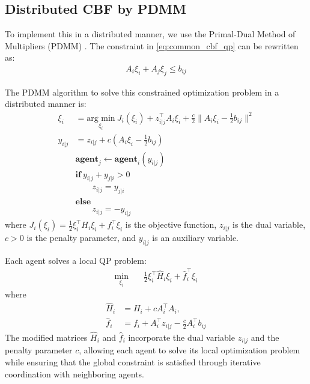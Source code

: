 \documentclass[fleqn,10pt,twocolumn]{SICE_FES25}
\theoremstyle{definition}
\theoremstyle{plain}
\begin{document}
\subsection{Distributed CBF by PDMM}

To implement this in a distributed manner, we use the Primal-Dual Method of Multipliers (PDMM) \cite{ref10}. The constraint in \eqref{eq:common_cbf_qp} can be rewritten as:
\begin{equation}
\begin{aligned}
A_i \xi_i + A_j \xi_j \leq b_{ij}
\label{eq:common_cbf_constraint_rewritten}
\end{aligned}
\end{equation}

The PDMM algorithm to solve this constrained optimization problem in a distributed manner is:
\begin{equation}
\begin{aligned}
\xi_i &= \underset{\xi_i}{\text{arg min}} \:J_i(\xi_i) + z_{i|j}^\top A_i\xi_i + \frac{c}{2}\|A_i\xi_i - \frac{1}{2}b_{ij}\|^2 \\
y_{i|j} &= z_{i|j} + c(A_i\xi_i - \frac{1}{2}b_{ij}) \\
&{\mathbf{agent}}_j \leftarrow {\mathbf{agent}}_i(y_{i|j}) \\
&{\mathbf{if}}\:y_{i|j} + y_{j|i} > 0 \\
&\qquad z_{i|j} = y_{j|i} \\
&{\mathbf{else}} \\
&\qquad z_{i|j} = -y_{i|j}
\label{eq:pdmm_algorithm}
\end{aligned}
\end{equation}
where $J_i(\xi_i) = \frac{1}{2}\xi_i^\top H_i \xi_i + f_i^\top \xi_i$ is the objective function, $z_{i|j}$ is the dual variable, $c > 0$ is the penalty parameter, and $y_{i|j}$ is an auxiliary variable.

Each agent solves a local QP problem:
\begin{equation}
\begin{aligned}
    \min_{\xi_i} \quad & \frac{1}{2}\xi_i^\top \hat{H}_i \xi_i + \hat{f}_i^\top \xi_i
\label{eq:local_qp}
\end{aligned}
\end{equation}
where
\begin{equation}
\begin{aligned}
\hat{H}_i &= H_i + c A_i^\top A_i,\\
\hat{f}_i &= f_i + A_i^\top z_{i|j} - \frac{c}{2}A_i^\top b_{ij}
\end{aligned}
\end{equation}
The modified matrices $\hat{H}_i$ and $\hat{f}_i$ incorporate the dual variable $z_{i|j}$ and the penalty parameter $c$, allowing each agent to solve its local optimization problem while ensuring that the global constraint is satisfied through iterative coordination with neighboring agents.
\end{document}
